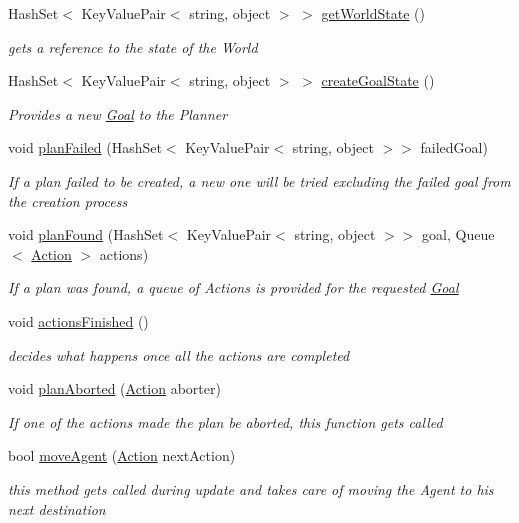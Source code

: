 \begin{DoxyCompactItemize}
\item 
Hash\+Set$<$ Key\+Value\+Pair$<$ string, object $>$ $>$ \hyperlink{interface_i_goap_afd9fa3eae6e1ee461505b33893637666}{get\+World\+State} ()
\begin{DoxyCompactList}\small\item\em gets a reference to the state of the World \end{DoxyCompactList}\item 
Hash\+Set$<$ Key\+Value\+Pair$<$ string, object $>$ $>$ \hyperlink{interface_i_goap_a33aed8ae113775001f4b2cc1729e5f7a}{create\+Goal\+State} ()
\begin{DoxyCompactList}\small\item\em Provides a new \hyperlink{class_goal}{Goal} to the Planner \end{DoxyCompactList}\item 
void \hyperlink{interface_i_goap_a2654ec9b902683ce5f5fe31434889ea0}{plan\+Failed} (Hash\+Set$<$ Key\+Value\+Pair$<$ string, object $>$$>$ failed\+Goal)
\begin{DoxyCompactList}\small\item\em If a plan failed to be created, a new one will be tried excluding the failed goal from the creation process \end{DoxyCompactList}\item 
void \hyperlink{interface_i_goap_a5aa7548d02bfd0f8f0143c15b4282cd0}{plan\+Found} (Hash\+Set$<$ Key\+Value\+Pair$<$ string, object $>$$>$ goal, Queue$<$ \hyperlink{class_action}{Action} $>$ actions)
\begin{DoxyCompactList}\small\item\em If a plan was found, a queue of Actions is provided for the requested \hyperlink{class_goal}{Goal} \end{DoxyCompactList}\item 
void \hyperlink{interface_i_goap_a62899286cd2362e0d870c688a98ccdd6}{actions\+Finished} ()
\begin{DoxyCompactList}\small\item\em decides what happens once all the actions are completed \end{DoxyCompactList}\item 
void \hyperlink{interface_i_goap_aee6419a123508fe7a8696ae9fde698f8}{plan\+Aborted} (\hyperlink{class_action}{Action} aborter)
\begin{DoxyCompactList}\small\item\em If one of the actions made the plan be aborted, this function gets called \end{DoxyCompactList}\item 
bool \hyperlink{interface_i_goap_a32aadeff3002e72b2e575cb21f527ec0}{move\+Agent} (\hyperlink{class_action}{Action} next\+Action)
\begin{DoxyCompactList}\small\item\em this method gets called during update and takes care of moving the Agent to his next destination \end{DoxyCompactList}\end{DoxyCompactItemize}


